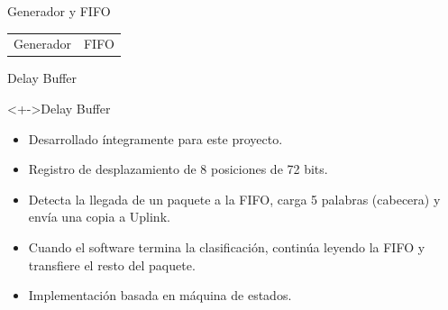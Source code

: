 \documentclass[xcolor=dvipsnames]{beamer}
\begin{document}
\begin{frame}{Generador y FIFO}
\begin{tabularx}{\linewidth}{VV}
      \\
      \tiny Generador
      &
      \tiny FIFO
      \\
    \end{tabularx}

\end{frame}


\begin{frame}{Delay Buffer}
 \begin{block}<+->{Delay Buffer}
	\begin{itemize}
      \scriptsize
	\item Desarrollado íntegramente para este proyecto.
	\item Registro de desplazamiento de 8 posiciones de 72 bits.
	\item Detecta la llegada de un paquete a la FIFO, carga 5 palabras (cabecera) y envía una copia a Uplink.
	\item Cuando el software termina la clasificación, continúa leyendo la FIFO y transfiere el resto del paquete.
	\item Implementación basada en máquina de estados.


\end{itemize}
\end{block}
\end{frame}
\end{document}
